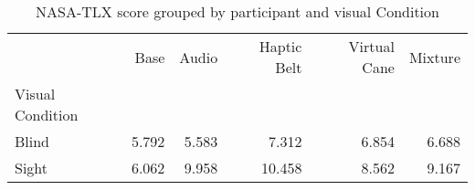 
\begin{table}[!htb]
\centering
\caption{NASA-TLX score grouped by participant and visual Condition}
\label{tab:nasa_average_group}
\begin{tabular}{lrrrrr}
\toprule
{} &  Base &  Audio &  Haptic Belt &  Virtual Cane &  Mixture \\
Visual Condition &       &        &              &               &          \\
\midrule
Blind            & 5.792 &  5.583 &        7.312 &         6.854 &    6.688 \\
Sight            & 6.062 &  9.958 &       10.458 &         8.562 &    9.167 \\
\bottomrule
\end{tabular}
\end{table}

